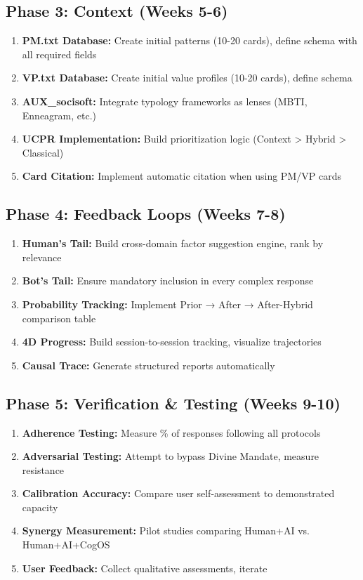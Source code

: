 \documentclass[11pt,a4paper]{article}
\theoremstyle{definition}
\theoremstyle{remark}
\begin{document}
\subsection{Phase 3: Context (Weeks 5-6)}

\begin{enumerate}
    \item \textbf{PM.txt Database:} Create initial patterns (10-20 cards), define schema with all required fields
    \item \textbf{VP.txt Database:} Create initial value profiles (10-20 cards), define schema
    \item \textbf{AUX\_socisoft:} Integrate typology frameworks as lenses (MBTI, Enneagram, etc.)
    \item \textbf{UCPR Implementation:} Build prioritization logic (Context > Hybrid > Classical)
    \item \textbf{Card Citation:} Implement automatic citation when using PM/VP cards
\end{enumerate}

\subsection{Phase 4: Feedback Loops (Weeks 7-8)}

\begin{enumerate}
    \item \textbf{Human's Tail:} Build cross-domain factor suggestion engine, rank by relevance
    \item \textbf{Bot's Tail:} Ensure mandatory inclusion in every complex response
    \item \textbf{Probability Tracking:} Implement Prior → After → After-Hybrid comparison table
    \item \textbf{4D Progress:} Build session-to-session tracking, visualize trajectories
    \item \textbf{Causal Trace:} Generate structured reports automatically
\end{enumerate}

\subsection{Phase 5: Verification \& Testing (Weeks 9-10)}

\begin{enumerate}
    \item \textbf{Adherence Testing:} Measure \% of responses following all protocols
    \item \textbf{Adversarial Testing:} Attempt to bypass Divine Mandate, measure resistance
    \item \textbf{Calibration Accuracy:} Compare user self-assessment to demonstrated capacity
    \item \textbf{Synergy Measurement:} Pilot studies comparing Human+AI vs. Human+AI+CogOS
    \item \textbf{User Feedback:} Collect qualitative assessments, iterate
\end{enumerate}
\end{document}
